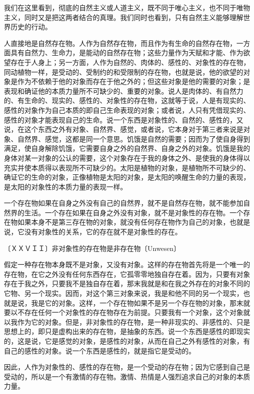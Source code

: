 \documentclass[a4paper,twoside,12pt]{ctexart}
\begin{document}
我们在这里看到，彻底的自然主义或人道主义，既不同于唯心主义，也不同于唯物主义，同时又是把这两者结合的真理。我们同时也看到，只有自然主义能够理解世界历史的行动。
 
人直接地是自然存在物。人作为自然存在物，而且作为有生命的自然存在物，一方面具有自然力、生命力，是能动的自然存在物；这些力量作为天赋和才能、作为欲望存在于人身上；另一方面，人作为自然的、肉体的、感性的、对象性的存在物，同动植物一样，是受动的、受制约的和受限制的存在物，也就是说，他的欲望的对象是作为不依赖于他的对象而存在于他之外的；但这些对象是他的需要的对象；是表现和确证他的本质力量所不可缺少的、重要的对象。说人是肉体的、有自然力的、有生命的、现实的、感性的、对象性的存在物，这就等于说，人是有现实的、感性的对象作为自己本质的即自己生命表现的对象；或者说，人只有凭借现实的、感性的对象才能表现自己的生命。说一个东西是对象性的、自然的、感性的，又说，在这个东西之外有对象、自然界、感觉，或者说，它本身对于第三者来说是对象、自然界、感觉，这都是同一个意思。饥饿是自然的需要；因而为了使自身得到满足，使自身解除饥饿，它需要自身之外的自然界、自身之外的对象。饥饿是我的身体对某一对象的公认的需要，这个对象存在于我的身体之外、是使我的身体得以充实并使本质得以表现所不可缺少的。太阳是植物的对象，是植物所不可缺少的、确证它的生命的对象，正像植物是太阳的对象，是太阳的唤醒生命的力量的表现，是太阳的对象性的本质力量的表现一样。

一个存在物如果在自身之外没有自己的自然界，就不是自然存在物，就不能参加自然界的生活。一个存在如果在自身之外没有对象，就不是对象性的存在物。一个存在物如果本身不是第三存在物的对象，就没有任何存在物作为自己的对象，也就是说，它没有对象性的关系，它的存在就不是对象性的存在。

〔ＸＸＶＩＩ〕非对象性的存在物是非存在物〔Unwesen〕

假定一种存在物本身既不是对象，又没有对象。这样的存在物首先将是一个唯一的存在物，在它之外没有任何东西存在，它孤零零地独自存在着。因为，只要有对象存在于我之外，只要我不是独自存在着，那末我就是和在我之外存在的对象不同的它物、另一个现实。因而，对这个第三对象来说，我是和他不同的另一个现实，也就是说，我是它的对象。这样，一个存在物如果不是另一个存在物的对象，那末就要以不存在任何一个对象性的存在物存在为前提。只要我有一个对象，这个对象就以我作为它的对象。但是，非对象性的存在物，是一种非现实的、非感性的、只是思想上的，即只是虚构出来的存在物，是抽象的东西。说一个东西是感性的即现实的，这是说，它是感觉的对象，是感性的对象，从而在自己之外有感性的对象，有自己的感性的对象。说一个东西是感性的，就是指它是受动的。

因此，人作为对象性的、感性的存在物，是一个受动的存在物；因为它感到自己是受动的，所以是一个有激情的存在物。激情、热情是人强烈追求自己的对象的本质力量。
\end{document}
